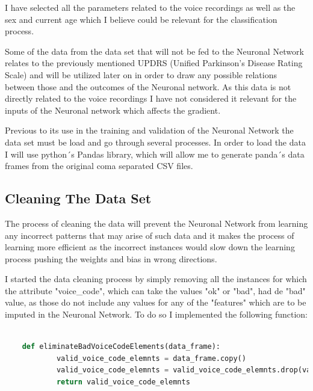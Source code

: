 \documentclass[12pt, a4paper]{article}
\begin{document}
	\vspace{5mm}
	
	
	
	\vspace{5mm}
	
	I have selected all the parameters related to the voice recordings as well as the sex and current age which I believe could be relevant for the classification process.
	 
	Some of the data from the data set that will not be fed to the Neuronal Network relates to the previously mentioned UPDRS (Unified Parkinson's Disease Rating Scale) and will be utilized later on in order to draw any possible relations between those and the outcomes of the Neuronal network. As this data is not directly related to the voice recordings I have not considered it relevant for the inputs of the Neuronal network which affects the gradient.
	
	Previous to its use in the training and validation of the Neuronal Network the data set must be load and go through several processes. In order to load the data I will use python´s Pandas library, which will allow me to generate panda´s data frames from the original coma separated CSV files.
	
	\clearpage
	
	\subsection{Cleaning The Data Set }
	
	The process of cleaning the data will prevent the Neuronal Network from learning any incorrect patterns that may arise of such data and it makes the process of learning more efficient as the incorrect instances would slow down the learning process pushing the weights and bias in wrong directions.
	
	I started the data cleaning process by simply removing all the instances for which the attribute "voice\_code", which can take the values "ok" or "bad", had de "bad" value, as those do not include any values for any of the "features" which are to be imputed in the Neuronal Network. To do so I implemented the following function:
	
	\vspace{5mm}
	
	\begin{lstlisting}[language=Python]
		
	def eliminateBadVoiceCodeElements(data_frame):
			valid_voice_code_elemnts = data_frame.copy()
			valid_voice_code_elemnts = valid_voice_code_elemnts.drop(valid_voice_code_elemnts[valid_voice_code_elemnts["voice_code"] == "bad" ].index)
			return valid_voice_code_elemnts
	\end{lstlisting}
	
\end{document}
